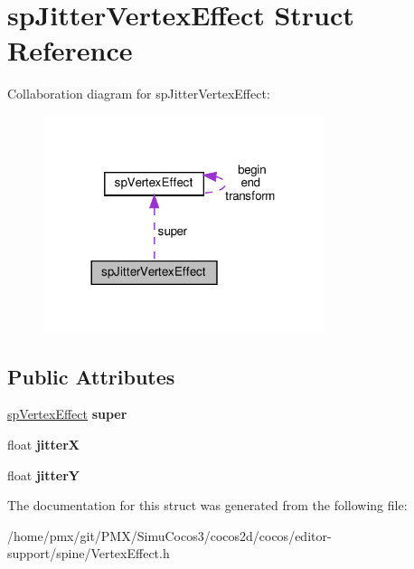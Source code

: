 \hypertarget{structspJitterVertexEffect}{}\section{sp\+Jitter\+Vertex\+Effect Struct Reference}
\label{structspJitterVertexEffect}


Collaboration diagram for sp\+Jitter\+Vertex\+Effect\+:
\nopagebreak
\begin{figure}[H]
\begin{center}
\leavevmode
\includegraphics[width=233pt]{structspJitterVertexEffect__coll__graph}
\end{center}
\end{figure}
\subsection*{Public Attributes}
\begin{DoxyCompactItemize}
\item 
\mbox{\label{structspJitterVertexEffect_a3ec41b78fad08256f64b0b82bcd48f2b}} 
\hyperlink{structspVertexEffect}{sp\+Vertex\+Effect} {\bfseries super}
\item 
\mbox{\label{structspJitterVertexEffect_a2d2325b68a2d09399e6dba55aa1a3192}} 
float {\bfseries jitterX}
\item 
\mbox{\label{structspJitterVertexEffect_af98e206673aef9e5eba7b17275bcfee8}} 
float {\bfseries jitterY}
\end{DoxyCompactItemize}


The documentation for this struct was generated from the following file\+:\begin{DoxyCompactItemize}
\item 
/home/pmx/git/\+P\+M\+X/\+Simu\+Cocos3/cocos2d/cocos/editor-\/support/spine/Vertex\+Effect.\+h\end{DoxyCompactItemize}

